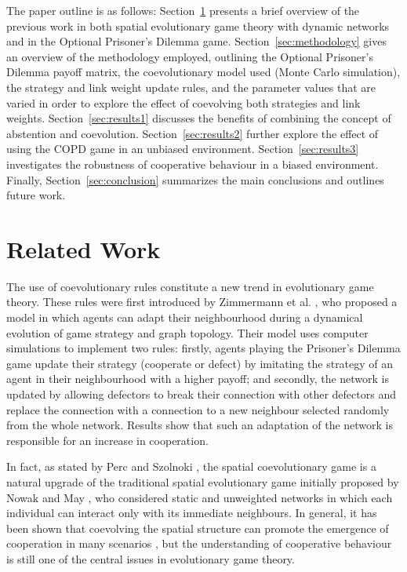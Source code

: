 \documentclass{llncs}
\begin{document}
The paper outline is as follows: Section~\ref{sec:related} presents a brief
overview of the previous work in both spatial evolutionary game theory with
dynamic networks and in the Optional Prisoner's Dilemma game.
Section~\ref{sec:methodology} gives an overview of the methodology employed,
outlining the Optional Prisoner's Dilemma payoff matrix, the coevolutionary
model used (Monte Carlo simulation), the strategy and link weight update rules,
and the parameter values that are varied in order to explore the effect of
coevolving both strategies and link weights.
Section~\ref{sec:results1} discusses the benefits of combining the concept of
abstention and coevolution.
Section~\ref{sec:results2} further explore the effect of using the COPD game
in an unbiased environment.
Section~\ref{sec:results3} investigates the robustness of cooperative behaviour
in a biased environment.
Finally, Section~\ref{sec:conclusion} summarizes the main conclusions and
outlines future work.


\section{Related Work}
\label{sec:related}

The use of coevolutionary rules constitute a new trend in evolutionary game
theory.  These rules were first introduced by Zimmermann et al.
\cite{Zimmermann2001}, who proposed a model in which agents can adapt their
neighbourhood during a dynamical evolution of game strategy and graph topology.
Their model uses computer simulations to implement two rules: firstly, agents
playing the Prisoner's Dilemma game update their strategy (cooperate or defect)
by imitating the strategy of an agent  in their neighbourhood with a higher
payoff; and secondly, the network is updated by allowing defectors to break
their connection with other defectors and replace the connection with a
connection to a new neighbour selected randomly from the whole network.
Results show that such an adaptation of the network is responsible for an
increase in cooperation.

In fact, as stated by Perc and Szolnoki \cite{Perc2010}, the spatial
coevolutionary game is a natural upgrade of the traditional spatial
evolutionary game initially proposed by Nowak and May \cite{Nowak1992}, who
considered static and unweighted networks in which each individual can interact
only with its immediate neighbours. In general, it has been shown that
coevolving the spatial structure can promote the emergence of cooperation in
many scenarios \cite{Wang2014,Cao2011}, but the understanding of cooperative
behaviour is still one of the central issues in evolutionary game theory.
\end{document}
